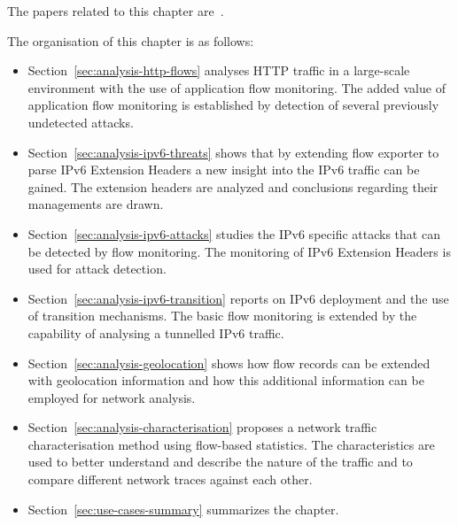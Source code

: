 \begin{chapintro}
The papers related to this chapter are~\cite{Husak-2015-Security, Hendriks-2017-Flow, Hendriks-2017-Threats, Elich-2013-Investigation, Celeda-2013-Large, Velan-2016-Network}.

The organisation of this chapter is as follows:
\begin{itemize}
  \item Section~\ref{sec:analysis-http-flows} analyses HTTP traffic in a large-scale environment with the use of application flow monitoring. The added value of application flow monitoring is established by detection of several previously undetected attacks.
  \item Section~\ref{sec:analysis-ipv6-threats} shows that by extending flow exporter to parse IPv6 Extension Headers a new insight into the IPv6 traffic can be gained. The extension headers are analyzed and conclusions regarding their managements are drawn.
  \item Section~\ref{sec:analysis-ipv6-attacks} studies the IPv6 specific attacks that can be detected by flow monitoring. The monitoring of IPv6 Extension Headers is used for attack detection.
  \item Section~\ref{sec:analysis-ipv6-transition} reports on IPv6 deployment and the use of transition mechanisms. The basic flow monitoring is extended by the capability of analysing a tunnelled IPv6 traffic.
  \item Section~\ref{sec:analysis-geolocation} shows how flow records can be extended with geolocation information and how this additional information can be employed for network analysis.
  \item Section~\ref{sec:analysis-characterisation} proposes a network traffic characterisation method using flow-based statistics. The characteristics are used to better understand and describe the nature of the traffic and to compare different network traces against each other.
  \item Section~\ref{sec:use-cases-summary} summarizes the chapter.
\end{itemize}

\end{chapintro}

